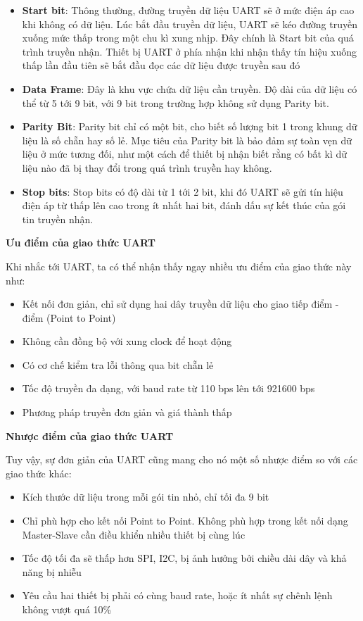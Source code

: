 \begin{itemize}
    \item \textbf{Start bit}: Thông thường, đường truyền dữ liệu UART sẽ ở mức điện áp cao khi không có dữ liệu. Lúc bắt đầu truyền dữ liệu, UART sẽ kéo đường truyền xuống mức thấp trong một chu kì xung nhịp. Đây chính là Start bit của quá trình truyền nhận. Thiết bị UART ở phía nhận khi nhận thấy tín hiệu xuống thấp lần đầu tiên sẽ bắt đầu đọc các dữ liệu được truyền sau đó
    \item \textbf{Data Frame}: Đây là khu vực chứa dữ liệu cần truyền. Độ dài của dữ liệu có thể từ 5 tới 9 bit, với 9 bit trong trường hợp không sử dụng Parity bit. 
    \item \textbf{Parity Bit}: Parity bit chỉ có một bit, cho biết số lượng bit 1 trong khung dữ liệu là số chẵn hay số lẻ. Mục tiêu của Parity bit là bảo đảm sự toàn vẹn dữ liệu ở mức tương đối, như một cách để thiết bị nhận biết rằng có bất kì dữ liệu nào đã bị thay đổi trong quá trình truyền hay không. 
    \item \textbf{Stop bits}: Stop bits có độ dài từ 1 tới 2 bit, khi đó UART sẽ gửi tín hiệu điện áp từ thấp lên cao trong ít nhất hai bit, đánh dấu sự kết thúc của gói tin truyền nhận.
\end{itemize}

\textbf{Ưu điểm của giao thức UART}

Khi nhắc tới UART, ta có thể nhận thấy ngay nhiều ưu điểm của giao thức này như:

\begin{itemize}
    \item Kết nối đơn giản, chỉ sử dụng hai dây truyền dữ liệu cho giao tiếp điểm - điểm (Point to Point)
    \item Không cần đồng bộ với xung clock để hoạt động
    \item Có cơ chế kiểm tra lỗi thông qua bit chẵn lẻ
    \item Tốc độ truyền đa dạng, với baud rate từ 110 bps lên tới 921600 bps
    \item Phương pháp truyền đơn giản và giá thành thấp
\end{itemize}

\textbf{Nhược điểm của giao thức UART}

Tuy vậy, sự đơn giản của UART cũng mang cho nó một số nhược điểm so với các giao thức khác:

\begin{itemize}
    \item Kích thước dữ liệu trong mỗi gói tin nhỏ, chỉ tối đa 9 bit
    \item Chỉ phù hợp cho kết nối Point to Point. Không phù hợp trong kết nối dạng Master-Slave cần điều khiển nhiều thiết bị cùng lúc
    \item Tốc độ tối đa sẽ thấp hơn SPI, I2C, bị ảnh hưởng bởi chiều dài dây và khả năng bị nhiễu
    \item Yêu cầu hai thiết bị phải có cùng baud rate, hoặc ít nhất sự chênh lệnh không vượt quá 10\%
\end{itemize}

